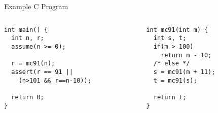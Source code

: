 \begin{frame}[fragile]{Example C Program}

  \begin{columns}[T]
    \begin{column}[T]{.4\linewidth}
      \begin{verbatim}
int main() {
  int n, r;
  assume(n >= 0);

  r = mc91(n);
  assert(r == 91 || 
    (n>101 && r==n-10));

  return 0;
}
      \end{verbatim}
    \end{column}

    \begin{column}[T]{.4\linewidth}
      \begin{verbatim}
int mc91(int m) {
  int s, t;
  if(m > 100)
    return m - 10;
  /* else */
  s = mc91(m + 11);
  t = mc91(s);

  return t;
}
      \end{verbatim}
    \end{column}
  \end{columns}

\end{frame}

